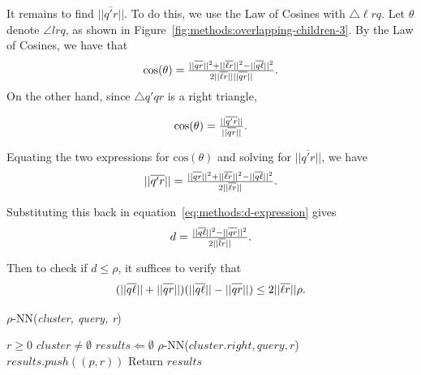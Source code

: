 It remains to find $||\overline{q'r}||$. To do this, we use the Law of Cosines with $\triangle \ell rq$. Let $\theta$ denote $\angle lrq$, as shown in Figure~\ref{fig:methods:overlapping-children-3}. By the Law of Cosines, we have that 
\begin{equation} \text{cos}(\theta) = \tfrac{||\overline{qr\vphantom \ell}||^2 + ||\overline{\ell r}||^2 - ||\overline{q\ell}||^2}{2||\overline{\ell r}||||\overline{qr \vphantom \ell}||}.\end{equation}
On the other hand, since $\triangle q'qr$ is a right triangle, 

\begin{equation} \text{cos}(\theta) = \tfrac{||\overline{q'r}||}{||\overline{qr \vphantom \ell}||}.\end{equation}


Equating the two expressions for $\text{cos}(\theta)$ and solving for $||\overline{q'r}||$, we have \begin{equation} ||\overline{q'r}|| = \tfrac{||\overline{qr\vphantom \ell}||^2 + ||\overline{\ell r}||^2 - ||\overline{q\ell}||^2}{2 ||\overline{\ell r}||}. \end{equation}


Substituting this back in equation~\ref{eq:methods:d-expression} gives 
\begin{equation} d = \tfrac{||\overline{q\ell}||^2 - ||\overline{qr \vphantom \ell}||^2}{2||\overline{lr}||}.\end{equation}


Then to check if $d \leq \rho$, it suffices to verify that \begin{equation}(||\overline{q\ell}|| + ||\overline{qr \vphantom \ell}||)(||\overline{q\ell}||- ||\overline{qr \vphantom \ell}||) \leq 2||\overline{\ell r}||\rho. \end{equation} 

\begin{algorithm} 
    \caption{$\rho$-NN(\emph{cluster, query, r})} 
    \label{alg:methods:rnn-search} 
    \begin{algorithmic}
        \REQUIRE $r \geq 0$
        \REQUIRE $cluster \neq \emptyset$
        \STATE $results \Leftarrow \emptyset$
            \ENDIF
        \ENDIF
                \STATE $\rho$-NN($cluster.right, query, r$)
            \ENDIF
        \ENDIF
                    \STATE $results.push((p, r))$
                \ENDIF
            \ENDFOR
        \ENDIF
        \STATE Return $results$
    \end{algorithmic}
\end{algorithm}

